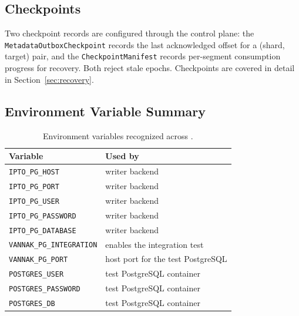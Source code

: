 \subsection{Checkpoints}

Two checkpoint records are configured through the control plane: the
\texttt{MetadataOutboxCheckpoint} records the last acknowledged offset for a
(shard, target) pair, and the \texttt{CheckpointManifest} records per-segment
consumption progress for recovery. Both reject stale epochs. Checkpoints are
covered in detail in Section~\ref{sec:recovery}.

\subsection{Environment Variable Summary}

\begin{table}[htbp]
\centering
\begin{tabular}{ll}
\hline
Variable & Used by \\
\hline
\texttt{IPTO\_PG\_HOST} & \ipto{} writer backend \\
\texttt{IPTO\_PG\_PORT} & \ipto{} writer backend \\
\texttt{IPTO\_PG\_USER} & \ipto{} writer backend \\
\texttt{IPTO\_PG\_PASSWORD} & \ipto{} writer backend \\
\texttt{IPTO\_PG\_DATABASE} & \ipto{} writer backend \\
\texttt{VANNAK\_PG\_INTEGRATION} & enables the integration test \\
\texttt{VANNAK\_PG\_PORT} & host port for the test PostgreSQL \\
\texttt{POSTGRES\_USER} & test PostgreSQL container \\
\texttt{POSTGRES\_PASSWORD} & test PostgreSQL container \\
\texttt{POSTGRES\_DB} & test PostgreSQL container \\
\hline
\end{tabular}
\caption{Environment variables recognized across \vannak{}.}
\end{table}

\endinput
